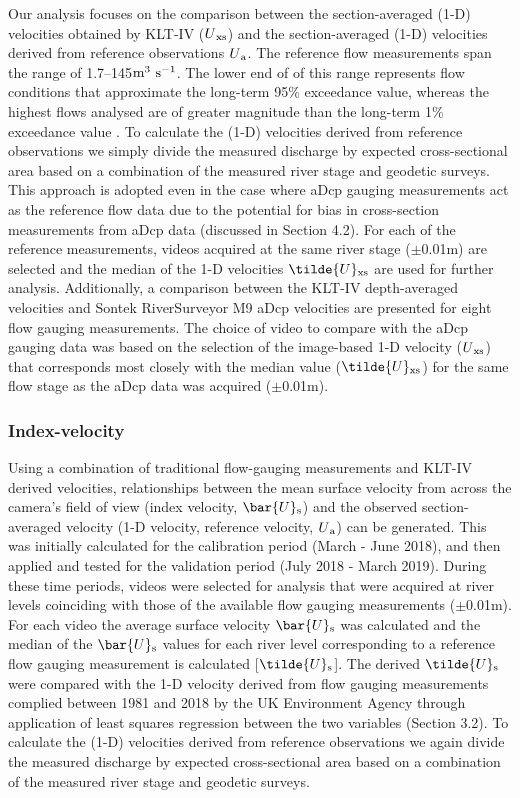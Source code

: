 \documentclass[hess, manuscript]{copernicus}
\begin{document}
Our analysis focuses on the comparison between the section-averaged (1-D) velocities obtained by KLT-IV (${U}\textsubscript{xs}$) and the section-averaged (1-D) velocities derived from reference observations $U\textsubscript{a}$. The reference flow measurements span the range of 1.7--145$\textnormal{m\textsuperscript{3} s\textsuperscript{-1}}$. The lower end of of this range represents flow conditions that approximate the long-term 95\% exceedance value, whereas the highest flows analysed are of greater magnitude than the long-term 1\% exceedance value \citep{ceh2024}. To calculate the (1-D) velocities derived from reference observations we simply divide the measured discharge by expected cross-sectional area based on a combination of the measured river stage and geodetic surveys. This approach is adopted even in the case where aDcp gauging measurements act as the reference flow data due to the potential for bias in cross-section measurements from aDcp data (discussed in Section 4.2). For each of the reference measurements, videos acquired at the same river stage ($\pm$0.01m) are selected and the median of the 1-D velocities $\tilde{U}\textsubscript{xs}$ are used for further analysis. Additionally, a comparison between the KLT-IV depth-averaged velocities and Sontek RiverSurveyor M9 aDcp velocities are presented for eight flow gauging measurements. The choice of video to compare with the aDcp gauging data was based on the selection of the image-based 1-D velocity (${U}\textsubscript{xs}$) that corresponds most closely with the median value ($\tilde{U}\textsubscript{xs}$) for the same flow stage as the aDcp data was acquired ($\pm$0.01m).


\subsubsection{Index-velocity} \label{Index-velocity}
Using a combination of traditional flow-gauging measurements and KLT-IV derived velocities, relationships between the mean surface velocity from across the camera's field of view (index velocity, $\bar{U}\textsubscript{s}$) and the observed section-averaged velocity (1-D velocity, reference velocity, $U\textsubscript{a}$) can be generated. This was initially calculated for the calibration period (March - June 2018), and then applied and tested for the validation period (July 2018 - March 2019). During these time periods, videos were selected for analysis that were acquired at river levels coinciding with those of the available flow gauging measurements ($\pm$0.01m). For each video the average surface velocity $\bar{U}\textsubscript{s}$ was calculated and the median of the $\bar{U}\textsubscript{s}$ values for each river level corresponding to a reference flow gauging measurement is calculated [$\tilde{U}\textsubscript{s}$]. The derived $\tilde{U}\textsubscript{s}$ were compared with the 1-D velocity derived from flow gauging measurements complied between 1981 and 2018 by the UK Environment Agency through application of least squares regression between the two variables (Section 3.2). To calculate the (1-D) velocities derived from reference observations we again divide the measured discharge by expected cross-sectional area based on a combination of the measured river stage and geodetic surveys.
\end{document}
